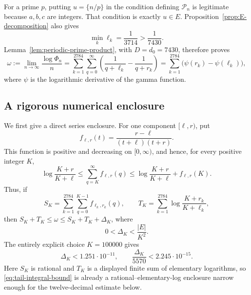 \documentclass[11pt,reqno,letterpaper]{amsart}
\numberwithin{equation}{section}
\theoremstyle{definition}
\theoremstyle{remark}
\begin{document}
For a prime \(p\), putting \(u=\{n/p\}\) in the condition defining
\(\mathcal P_n\) is legitimate because \(a,b,c\) are integers.  That
condition is exactly \(u\in E\).  Proposition~\ref{prop:E-decomposition}
also gives
\[
 \min_k\ell_k=\frac1{3714}>\frac1{7430}.
\]
Lemma~\ref{lem:periodic-prime-product}, with \(D=d_0=7430\), therefore
proves
\begin{equation}\label{eq:omega-series}
 \omega:=\lim_{n\to\infty}\frac{\log\Phi_n}{n}
 =\sum_{k=1}^{2784}\sum_{q=0}^{\infty}
 \left(\frac1{q+\ell_k}-\frac1{q+r_k}\right)
 =\sum_{k=1}^{2784}\bigl(\psi(r_k)-\psi(\ell_k)\bigr),
\end{equation}
where \(\psi\) is the logarithmic derivative of the gamma function.

\subsection{A rigorous numerical enclosure}

We first give a direct series enclosure.  For one component
\([\ell,r)\), put
\[
 f_{\ell,r}(t)=\frac{r-\ell}{(t+\ell)(t+r)}.
\]
This function is positive and decreasing on \([0,\infty)\), and hence,
for every positive integer \(K\),
\begin{equation}\label{eq:tail-integral-bound}
 \log\frac{K+r}{K+\ell}
 \leq\sum_{q=K}^{\infty}f_{\ell,r}(q)
 \leq\log\frac{K+r}{K+\ell}+f_{\ell,r}(K).
\end{equation}
Thus, if
\[
 S_K=\sum_{k=1}^{2784}\sum_{q=0}^{K-1}f_{\ell_k,r_k}(q),
 \qquad
 T_K=\sum_{k=1}^{2784}\log\frac{K+r_k}{K+\ell_k},
\]
then \(S_K+T_K\leq\omega\leq S_K+T_K+\Delta_K\), where
\begin{equation}\label{eq:direct-tail-width}
 0<\Delta_K<\frac{|E|}{K^2}.
\end{equation}
The entirely explicit choice \(K=100000\) gives
\[
 \Delta_K<1.251\cdot10^{-11},
 \qquad \frac{\Delta_K}{5570}<2.245\cdot10^{-15}.
\]
Here \(S_K\) is rational and \(T_K\) is a displayed finite sum of
elementary logarithms, so \eqref{eq:tail-integral-bound} is already a
rational--elementary-log enclosure narrow enough for the twelve-decimal
estimate below.
\end{document}
